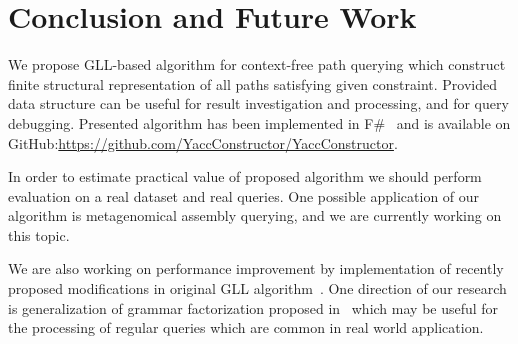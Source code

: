 \section{Conclusion and Future Work}

We propose GLL-based algorithm for context-free path querying which construct finite structural representation of all paths satisfying given constraint.
Provided data structure can be useful for result investigation and processing, and for query debugging.
Presented algorithm has been implemented in F\#~\cite{FSharp} and is available on GitHub:\url{https://github.com/YaccConstructor/YaccConstructor}.

In order to estimate practical value of proposed algorithm we should perform evaluation on a real dataset and real queries.
One possible application of our algorithm is metagenomical assembly querying, and we are currently working on this topic.

We are also working on performance improvement by implementation of recently proposed modifications in original GLL algorithm~\cite{FGLL,FastPracticalGLL}.
One direction of our research is generalization of grammar factorization proposed in~\cite{FGLL} which may be useful for the processing of regular queries which are common in real world application.


